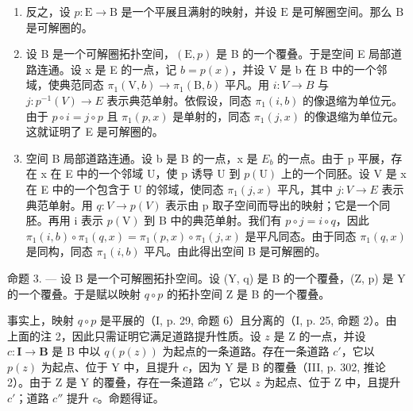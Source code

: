 \begin{enumerate}
\def\labelenumi{\alph{enumi})}
\setcounter{enumi}{1}
\item
  反之，设 \(p \colon \mathrm{E} \to \mathrm{B}\) 是一个平展且满射的映射，并设 \(\mathrm{E}\) 是可解圈空间。那么 \(\mathrm{B}\) 是可解圈的。
\item
  设 B 是一个可解圈拓扑空间，\((\mathrm{E}, p)\) 是 B 的一个覆叠。于是空间 E 局部道路连通。设 x 是 E 的一点，记 \(b = p(x)\)，并设 V 是 b 在 B 中的一个邻域，使典范同态 \(\pi_{1}(\mathrm{V}, b) \to \pi_{1}(\mathrm{B}, b)\) 平凡。用 \(i: V \to B\) 与 \(j: p^{-1}(V) \to E\) 表示典范单射。依假设，同态 \(\pi_{1}(i, b)\) 的像退缩为单位元。由于 \(p \circ i = j \circ p\) 且 \(\pi_{1}(p, x)\) 是单射的，同态 \(\pi_{1}(j, x)\) 的像退缩为单位元。这就证明了 E 是可解圈的。
\item
  空间 B 局部道路连通。设 b 是 B 的一点，x 是 \(E_{b}\) 的一点。由于 p 平展，存在 x 在 E 中的一个邻域 U，使 p 诱导 U 到 \(p(\mathrm{U})\) 上的一个同胚。设 V 是 x 在 E 中的一个包含于 U 的邻域，使同态 \(\pi_{1}(j,x)\) 平凡，其中 \(j:V\to E\) 表示典范单射。用 \(q:V\to p(V)\) 表示由 p 取子空间而导出的映射；它是一个同胚。再用 i 表示 \(p(\mathrm{V})\) 到 B 中的典范单射。我们有 \(p\circ j=i\circ q\)，因此 \(\pi_{1}(i,b)\circ\pi_{1}(q,x)=\pi_{1}(p,x)\circ\pi_{1}(j,x)\) 是平凡同态。由于同态 \(\pi_{1}(q,x)\) 是同构，同态 \(\pi_{1}(i,b)\) 平凡。由此得出空间 B 是可解圈的。
\end{enumerate}

命题 3. --- 设 B 是一个可解圈拓扑空间。设 (Y, q) 是 B 的一个覆叠，(Z, p) 是 Y 的一个覆叠。于是赋以映射 \(q \circ p\) 的拓扑空间 Z 是 B 的一个覆叠。

事实上，映射 \(q \circ p\) 是平展的（I, p. 29, 命题 6）且分离的（I, p. 25, 命题 2）。由上面的注 2，因此只需证明它满足道路提升性质。设 \(z\) 是 Z 的一点，并设 \(c \colon \mathbf{I} \to \mathbf{B}\) 是 B 中以 \(q(p(z))\) 为起点的一条道路。存在一条道路 \(c'\)，它以 \(p(z)\) 为起点、位于 Y 中，且提升 \(c\)，因为 Y 是 B 的覆叠（III, p. 302, 推论 2）。由于 Z 是 Y 的覆叠，存在一条道路 \(c''\)，它以 \(z\) 为起点、位于 Z 中，且提升 \(c'\)；道路 \(c''\) 提升 \(c\)。命题得证。

